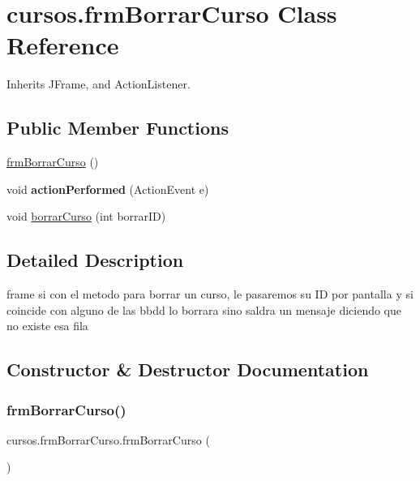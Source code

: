 \hypertarget{classcursos_1_1frm_borrar_curso}{}\section{cursos.\+frm\+Borrar\+Curso Class Reference}
\label{classcursos_1_1frm_borrar_curso}


Inherits J\+Frame, and Action\+Listener.

\subsection*{Public Member Functions}
\begin{DoxyCompactItemize}
\item 
\hyperlink{classcursos_1_1frm_borrar_curso_a27294a796583931a3d9973b1a16a4191}{frm\+Borrar\+Curso} ()
\item 
\mbox{\label{classcursos_1_1frm_borrar_curso_a7da15b277347c371c51a6aa5c7623f8e}} 
void {\bfseries action\+Performed} (Action\+Event e)
\item 
void \hyperlink{classcursos_1_1frm_borrar_curso_adb924894795aa125f156446080aa3bd6}{borrar\+Curso} (int borrar\+ID)
\end{DoxyCompactItemize}


\subsection{Detailed Description}
frame si con el metodo para borrar un curso, le pasaremos su ID por pantalla y si coincide con alguno de las bbdd lo borrara sino saldra un mensaje diciendo que no existe esa fila 

\subsection{Constructor \& Destructor Documentation}
\mbox{\label{classcursos_1_1frm_borrar_curso_a27294a796583931a3d9973b1a16a4191}} 
\subsubsection{\texorpdfstring{frm\+Borrar\+Curso()}{frmBorrarCurso()}}
{\footnotesize\ttfamily cursos.\+frm\+Borrar\+Curso.\+frm\+Borrar\+Curso (\begin{DoxyParamCaption}{ }\end{DoxyParamCaption})}

